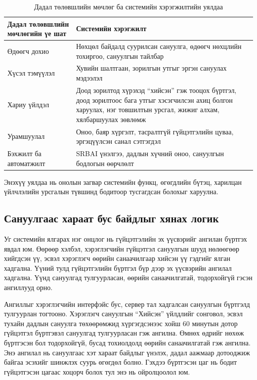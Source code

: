 \begin{table}[htbp]
\centering
\small
\setlength{\tabcolsep}{4pt}
\begin{tabular}{|L{4.8cm}|L{8.2cm}|}
\hline
\textbf{Дадал төлөвшлийн мөчлөгийн үе шат} & \textbf{Системийн хэрэгжилт} \\
\hline
Өдөөгч дохио & Нөхцөл байдалд суурилсан сануулга, өдөөгч нөхцлийн тохиргоо, сануулгын тайлбар \\
\hline
Хүсэл тэмүүлэл & Хувийн шалтгаан, зорилгын утгыг эргэн сануулах мэдээлэл \\
\hline
Хариу үйлдэл & Доод зорилтод хүрэхэд ``хийсэн'' гэж тооцох бүртгэл, доод зорилтоос бага утгыг хэсэгчилсэн ахиц болгон харуулах, нэг товшилтын урсгал, жижиг алхам, хялбаршуулах зөвлөмж \\
\hline
Урамшуулал & Оноо, баяр хүргэлт, тасралтгүй гүйцэтгэлийн цуваа, эргэцүүлсэн санал сэтгэгдэл \\
\hline
Бэхжилт ба автоматжилт & SRBAI үнэлгээ, дадлын хүчний оноо, сануулгын бодлогын өөрчлөлт \\
\hline
\end{tabular}
\caption{Дадал төлөвшлийн мөчлөг ба системийн хэрэгжилтийн уялдаа}
\end{table}

Энэхүү уялдаа нь онолын загвар системийн функц, өгөгдлийн бүтэц, харилцан үйлчлэлийн урсгалын түвшинд бодитоор тусгагдсан болохыг харуулна.

\subsection{Сануулгаас хараат бус байдлыг хянах логик}

Уг системийн ялгарах нэг онцлог нь гүйцэтгэлийн эх үүсвэрийг ангилан бүртгэх явдал юм. Өөрөөр хэлбэл, хэрэглэгчийн гүйцэтгэл сануулгын шууд нөлөөгөөр хийгдсэн үү, эсвэл хэрэглэгч өөрийн санаачилгаар хийсэн үү гэдгийг ялган хадгална. Үүний тулд гүйцэтгэлийн бүртгэл бүр дээр эх үүсвэрийн ангилал хадгална. Үүнд сануулгад тулгуурласан, өөрийн санаачилгатай, тодорхойгүй гэсэн ангиллууд орно.

Ангиллыг хэрэглэгчийн интерфэйс бус, сервер тал хадгалсан сануулгын бүртгэлд тулгуурлан тогтооно. Хэрэглэгч сануулгын ``Хийсэн'' үйлдлийг сонговол, эсвэл тухайн дадлын сануулга төхөөрөмжид хүргэгдсэнээс хойш 60 минутын дотор гүйцэтгэл бүртгэвэл сануулгад тулгуурласан гэж ангилна. Өмнөх өдрийг нөхөж бүртгэсэн бол тодорхойгүй, бусад тохиолдолд өөрийн санаачилгатай гэж ангилна. Энэ ангилал нь сануулгаас хэт хараат байдлыг үнэлэх, дадал аажмаар дотооджиж байгаа эсэхийг шинжлэх суурь өгөгдөл болно. Гэхдээ бүртгэсэн цаг нь бодит гүйцэтгэсэн цагаас хоцорч болох тул энэ нь ойролцоолол юм.

